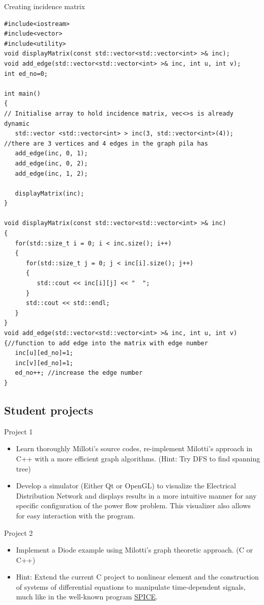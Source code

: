 \documentclass[xcolor=dvipsnames]{beamer}
\begin{document}
\begin{frame}[fragile,shrink=5]{Creating incidence matrix}
\begin{verbatim}
#include<iostream>
#include<vector>
#include<utility>
void displayMatrix(const std::vector<std::vector<int> >& inc);
void add_edge(std::vector<std::vector<int> >& inc, int u, int v);
int ed_no=0;

int main() 
{
// Initialise array to hold incidence matrix, vec<>s is already dynamic
   std::vector <std::vector<int> > inc(3, std::vector<int>(4));
//there are 3 vertices and 4 edges in the graph pila has
   add_edge(inc, 0, 1);
   add_edge(inc, 0, 2);
   add_edge(inc, 1, 2);
   
   displayMatrix(inc);
}

void displayMatrix(const std::vector<std::vector<int> >& inc) 
{
   for(std::size_t i = 0; i < inc.size(); i++)
   { 
      for(std::size_t j = 0; j < inc[i].size(); j++) 
      {
         std::cout << inc[i][j] << "  ";
      }
      std::cout << std::endl;
   }
}
void add_edge(std::vector<std::vector<int> >& inc, int u, int v) 
{//function to add edge into the matrix with edge number
   inc[u][ed_no]=1;
   inc[v][ed_no]=1;
   ed_no++; //increase the edge number
}
\end{verbatim}	
\end{frame}

\subsection{Student projects}

\begin{frame}{Project 1}
\begin{itemize}
	\item Learn thoroughly Milloti's source codes, re-implement Milotti's approach in C++ with a more efficient graph algorithms. (Hint: Try DFS to find spanning tree)
	\item Develop a simulator (Either Qt or OpenGL) to visualize the Electrical Distribution Network and displays results in a more intuitive manner for any specific configuration of the power flow problem. This visualizer also allows for easy interaction with the program.
\end{itemize}

\end{frame}

\begin{frame}{Project 2}
\begin{itemize}
	\item 	Implement a Diode example using Milotti's graph theoretic approach. (C or C++)
	\item   {\color{red}Hint}: Extend the current C project to nonlinear  element and the construction of systems of differential equations to manipulate time-dependent signals, much like in the well-known program \href{https://en.wikipedia.org/wiki/SPICE}{SPICE}. 
\end{itemize}


\end{frame}
\end{document}
